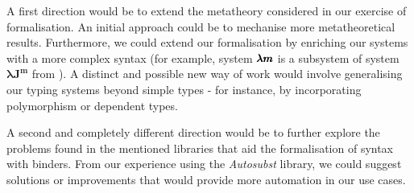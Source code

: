 A first direction would be to extend the metatheory considered in our exercise of formalisation.
An initial approach could be to mechanise more metatheoretical results.
Furthermore, we could extend our formalisation by enriching our systems with a more complex syntax (for example, system $\pmb{\lambda m}$ is a subsystem of system $\pmb{\lambda J^m}$ from \cite{JCESLuis}).
A distinct and possible new way of work would involve generalising our typing systems beyond simple types - for instance, by incorporating polymorphism or dependent types.

A second and completely different direction would be to further explore the problems found in the mentioned libraries that aid the formalisation of syntax with binders.
From our experience using the \textit{Autosubst} library, we could suggest solutions or improvements that would provide more automation in our use cases.

\begin{comment}
Furthermore,
\begin{itemize}
\item Could we have more automation?
  \subitem Could we only provide proofs for the hard cases proved in paper (easy results should be done automatically)?
  \subitem Could we have more \textit{Autosubst} automation available for our systems? Discuss this here? What about \textit{Autosubst2}?
  \subitem Could we have simpler formalisations? How so?
\item System $\pmb{\lambda Jm}$ is still not formalised.
\item Our modular definitions allow us to use the \textit{Autosubst} library to enrich our typing systems (dependent types, intersection types, SystemF, Lambda Cube and so on).

\end{itemize}

Mechanisations in relation with the formalisations on the paper.
\begin{itemize}
\item Some ideas for the metatheory formalised come from attempts of mechanisations.
\item The metatheory mechanised does not correspond exactly to the formalised in the literature.
  \subitem An example: the polymorphic definition for system $\LamM$.
\end{itemize}

Further work?
\begin{itemize}
\item Because of the modularity and of the \textit{Autosubst} library we have the facility to enrich our typing systems (ex: SystemF?).
\item Could there be more automation?  
\item Why use a outdated library for mechanising binders? What about \textit{Autosubst 2}?
\item Obstacles on the mechanisation of a non standard substitution operation.
\item SSreflect style proofs for \textit{Rocq Prover}.
\end{itemize}
\end{comment}

